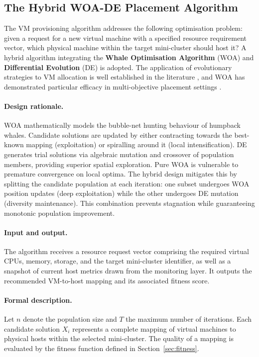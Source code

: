 \documentclass[12pt,a4paper]{report}
\begin{document}
\subsection{The Hybrid WOA-DE Placement Algorithm}

The VM provisioning algorithm addresses the following optimisation problem: given
a request for a new virtual machine with a specified resource requirement vector,
which physical machine within the target mini-cluster should host it? A hybrid
algorithm integrating the \textbf{Whale Optimisation Algorithm} (WOA)
\cite{mirjalili2016woa} and \textbf{Differential Evolution} (DE) \cite{storn1997de}
is adopted. The application of evolutionary strategies to VM allocation is well
established in the literature \cite{zhang2020intelligent}, and WOA has demonstrated
particular efficacy in multi-objective placement settings \cite{saxena2022secure}.

\paragraph{Design rationale.}
WOA mathematically models the bubble-net hunting behaviour of humpback whales.
Candidate solutions are updated by either contracting towards the best-known mapping
(exploitation) or spiralling around it (local intensification). DE generates trial
solutions via algebraic mutation and crossover of population members, providing
superior spatial exploration. Pure WOA is vulnerable to premature convergence on
local optima. The hybrid design mitigates this by splitting the candidate population
at each iteration: one subset undergoes WOA position updates (deep exploitation)
while the other undergoes DE mutation (diversity maintenance). This combination
prevents stagnation while guaranteeing monotonic population improvement.

\paragraph{Input and output.}
The algorithm receives a resource request vector comprising the required virtual
CPUs, memory, storage, and the target mini-cluster identifier, as well as a snapshot
of current host metrics drawn from the monitoring layer. It outputs the recommended
VM-to-host mapping and its associated fitness score.

\paragraph{Formal description.}
Let $n$ denote the population size and $T$ the maximum number of iterations. Each
candidate solution $X_i$ represents a complete mapping of virtual machines to
physical hosts within the selected mini-cluster. The quality of a mapping is
evaluated by the fitness function defined in Section~\ref{sec:fitness}.
\end{document}

